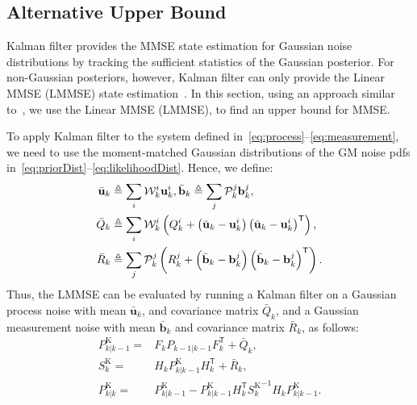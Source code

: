 \documentclass[10pt,twocolumn,twoside]{IEEEtran}
\newcommand{\tran}{^{\mathsf{T}}}
\newcommand{\corcol}[1]{\textcolor{CorCol}{#1}}
\begin{document}
\subsection{Alternative Upper Bound}
Kalman filter provides the MMSE state estimation for Gaussian noise distributions by tracking the sufficient statistics of the Gaussian posterior. For non-Gaussian posteriors, however, Kalman filter can only provide the Linear MMSE (LMMSE) state estimation~\cite{poor_introduction_1994}. In this section, using an approach similar to~\cite{flam_mmse_2012}, we use the Linear MMSE (LMMSE), to find an upper bound for MMSE. 

To apply Kalman filter to the system defined in~\eqref{eq:process}--\eqref{eq:measurement}, we need to use the moment-matched Gaussian distributions of the GM noise pdfs in~\eqref{eq:priorDist}--\eqref{eq:likelihoodDist}. Hence, we define:
\begin{align}
\bar{\mathbf{u}}_k & \triangleq \sum \limits _{i} \corcol{\mathcal{W}^i_k}\mathbf{u}^i_k, \bar{\mathbf{b}}_k  \triangleq \sum \limits _{j} \corcol{\mathcal{P}^j_k}\mathbf{b}^j_k,
\\
 \bar{Q}_k & \triangleq \sum \limits _{i} \corcol{\mathcal{W}^i_k}  \left(Q^i_k + \left(\bar{\mathbf{u}}_k-\mathbf{u}^i_k\right)\left(\bar{\mathbf{u}}_k-\mathbf{u}^i_k\right)\tran\right),
\\
 \bar{R}_k & \triangleq \sum \limits _{j} \corcol{\mathcal{P}^j_k} \left(R^j_k + \left(\bar{\mathbf{b}}_k-\mathbf{b}^j_k\right)\left(\bar{\mathbf{b}}_k-\mathbf{b}^j_k\right)\tran\right).
\end{align}
Thus, the LMMSE can be evaluated by running a Kalman filter on a Gaussian process noise with mean \(\bar{\mathbf{u}}_k\), and covariance matrix \(\bar{Q}_k\), and a Gaussian measurement noise with mean \(\bar{\mathbf{b}}_k\) and covariance matrix \(\bar{R}_k\), as follows:
\begin{align}
P_{k|k-1}^{\mathrm{K}} = & F_kP_{k-1|k-1}F_k\tran + \bar{Q}_k ,\\
S_k^{\mathrm{K}} = & H_kP_{k|k-1}^{\mathrm{K}}H_k\tran + \bar{R}_k,\\
\label{eq:PKalman}
P_{k|k}^{\mathrm{K}} = & P_{k|k-1}^{\mathrm{K}} - P_{k|k-1}^{\mathrm{K}} H_k \tran {S_k^{\mathrm{K}}}^{-1}H_kP_{k|k-1}^{\mathrm{K}}.
\end{align}
\end{document}
